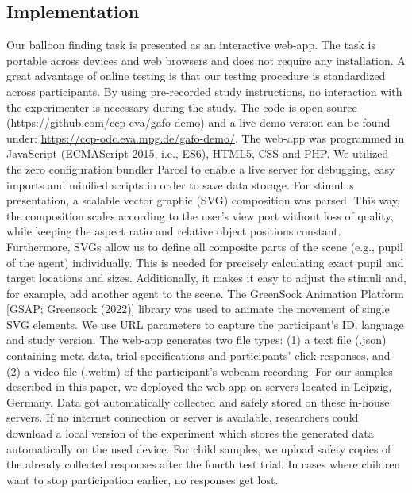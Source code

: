 \documentclass[
  man,floatsintext]{apa6}
\begin{document}
\hypertarget{implementation}{%
\subsection{Implementation}\label{implementation}}

Our balloon finding task is presented as an interactive web-app. The task is portable across devices and web browsers and does not require any installation. A great advantage of online testing is that our testing procedure is standardized across participants. By using pre-recorded study instructions, no interaction with the experimenter is necessary during the study. The code is open-source (\url{https://github.com/ccp-eva/gafo-demo}) and a live demo version can be found under: \url{https://ccp-odc.eva.mpg.de/gafo-demo/}.
The web-app was programmed in JavaScript (ECMAScript 2015, i.e., ES6), HTML5, CSS and PHP.
We utilized the zero configuration bundler Parcel to enable a live server for debugging, easy imports and minified scripts in order to save data storage.
For stimulus presentation, a scalable vector graphic (SVG) composition was parsed. This way, the composition scales according to the user's view port without loss of quality, while keeping the aspect ratio and relative object positions constant.
Furthermore, SVGs allow us to define all composite parts of the scene (e.g., pupil of the agent) individually. This is needed for precisely calculating exact pupil and target locations and sizes. Additionally, it makes it easy to adjust the stimuli and, for example, add another agent to the scene.
The GreenSock Animation Platform {[}GSAP; Greensock (2022){]} library was used to animate the movement of single SVG elements.
We use URL parameters to capture the participant's ID, language and study version.
The web-app generates two file types: (1) a text file (.json) containing meta-data, trial specifications and participants' click responses, and (2) a video file (.webm) of the participant's webcam recording.
For our samples described in this paper, we deployed the web-app on servers located in Leipzig, Germany. Data got automatically collected and safely stored on these in-house servers. If no internet connection or server is available, researchers could download a local version of the experiment which stores the generated data automatically on the used device. For child samples, we upload safety copies of the already collected responses after the fourth test trial. In cases where children want to stop participation earlier, no responses get lost.
\end{document}
